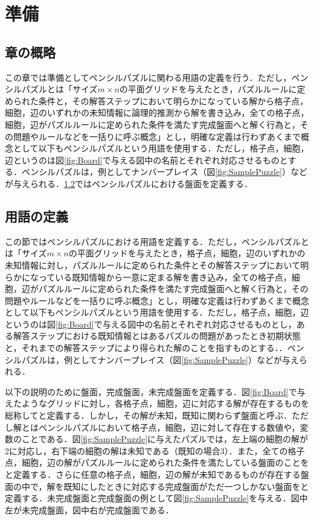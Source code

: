 \chapter{準備}\label{chapter:2}
\section{章の概略}\label{section:1}
この章では準備としてペンシルパズルに関わる用語の定義を行う．ただし，ペンシルパズルとは「サイズ$m\times n$の平面グリッドを与えたとき，パズルルールに定められた条件と，その解答ステップにおいて明らかになっている解から格子点，細胞，辺のいずれかの未知情報に論理的推測から解を書き込み，全ての格子点，細胞，辺がパズルルールに定められた条件を満たす完成盤面へと解く行為と，その問題やルールなどを一括りに呼ぶ概念」とし，明確な定義は行わずあくまで概念として以下もペンシルパズルという用語を使用する．ただし，格子点，細胞，辺というのは図\ref{fig:Board}で与える図中の名前とそれぞれ対応させるものとする．ペンシルパズルは，例としてナンバープレイス（図\ref{fig:SamplePuzzle}）などが与えられる．\ref{section:2}ではペンシルパズルにおける盤面を定義する．

\section{用語の定義}\label{section:2}
この節ではペンシルパズルにおける用語を定義する．ただし，ペンシルパズルとは「サイズ$m\times n$の平面グリッドを与えたとき，格子点，細胞，辺のいずれかの未知情報に対し，パズルルールに定められた条件とその解答ステップにおいて明らかになっている既知情報から一意に定まる解を書き込み，全ての格子点，細胞，辺がパズルルールに定められた条件を満たす完成盤面へと解く行為と，その問題やルールなどを一括りに呼ぶ概念」とし，明確な定義は行わずあくまで概念として以下もペンシルパズルという用語を使用する．ただし，格子点，細胞，辺というのは図\ref{fig:Board}で与える図中の名前とそれぞれ対応させるものとし，ある解答ステップにおける既知情報とはあるパズルの問題があったとき初期状態と，それまでの解答ステップにより得られた解のことを指すものとする．．ペンシルパズルは，例としてナンバープレイス（図\ref{fig:SamplePuzzle}）などが与えられる．

以下の説明のために盤面，完成盤面，未完成盤面を定義する．図\ref{fig:Board}で与えたようなグリッドに対し，各格子点，細胞，辺に対応する解が存在するものを総称してと定義する．しかし，その解が未知，既知に関わらず盤面と呼ぶ．ただし解とはペンシルパズルにおいて格子点，細胞，辺に対して存在する数値や，変数のことである．図\ref{fig:SamplePuzzle}に与えたパズルでは，左上端の細胞の解が2に対応し，右下端の細胞の解は未知である（既知の場合3）．また，全ての格子点，細胞，辺の解がパズルルールに定められた条件を満たしている盤面のことをと定義する．さらに任意の格子点，細胞，辺の解が未知であるものが存在する盤面の中で，解を既知にしたときに対応する完成盤面がただ一つしかない盤面をと定義する．未完成盤面と完成盤面の例として図\ref{fig:SamplePuzzle}を与える．図中左が未完成盤面，図中右が完成盤面である．

